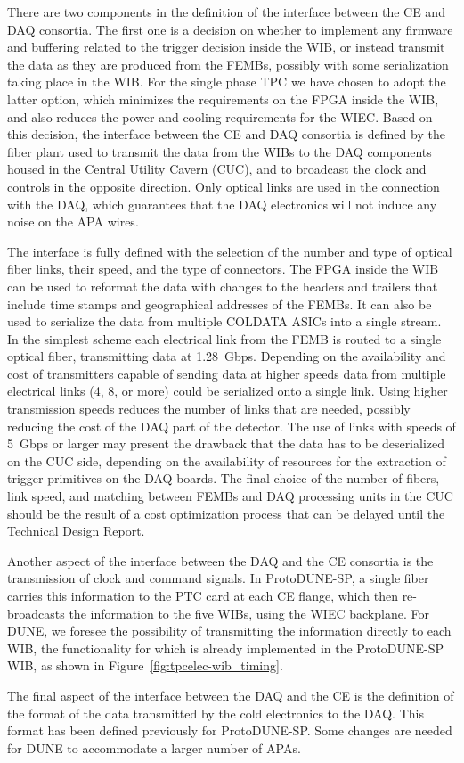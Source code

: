 There are two components in the definition of the interface between the CE
and DAQ consortia. The first one is a decision on whether to implement any
firmware and buffering related to the trigger decision inside the WIB, or
instead transmit the data as they are produced from the FEMBs, possibly with
some serialization taking place in the WIB. For the single phase TPC we have
chosen to adopt the latter option, which minimizes the requirements on the
FPGA inside the WIB, and also reduces the power and cooling requirements for the WIEC.
Based on this decision, the interface between the CE and DAQ consortia is
defined by the fiber plant
used to transmit the data from the WIBs to the DAQ components housed in the
Central Utility Cavern (CUC), and to broadcast the clock and controls in the
opposite direction. Only optical links are used in the connection with the DAQ,
which guarantees that the DAQ electronics will not induce any noise on the
APA wires.

The interface is fully defined with the selection of the number
and type of optical fiber links, their speed, and the type of connectors.
The FPGA inside the WIB can be used to reformat the data with changes to
the headers and trailers that include time stamps and geographical addresses
of the FEMBs. It can also be used to serialize the data from multiple
COLDATA ASICs into a single stream. In the simplest scheme each electrical
link from the FEMB is routed to a single optical fiber, transmitting data
at 1.28~Gbps. Depending on the availability and cost of transmitters
capable of sending data at higher speeds data from multiple electrical
links (4, 8, or more) could be serialized onto a single link. Using higher transmission
speeds reduces the number of links that are needed, possibly reducing the
cost of the DAQ part of the detector. The use of links with speeds
of 5~Gbps or larger may present the
drawback that the data has to be deserialized on the CUC side, depending
on the availability of resources for the extraction of trigger primitives
on the DAQ boards. The final choice of the number of fibers, link speed, and
matching between FEMBs and DAQ processing units in the CUC should be
the result of a cost optimization process that can be delayed until
the Technical Design Report.

Another aspect of the interface between the DAQ and the CE consortia is the
transmission of clock and command signals. In ProtoDUNE-SP, a single fiber
carries this information to the PTC card at each CE flange, which then re-broadcasts
the information to the five WIBs, using the WIEC backplane. For DUNE, we
foresee the possibility of transmitting the information directly to each
WIB, the functionality for which is already implemented in the ProtoDUNE-SP WIB, as
shown in Figure~\ref{fig:tpcelec-wib_timing}.

The final aspect of the interface between the DAQ and the CE is
the definition of the format of the data transmitted by the cold electronics
to the DAQ.  This format has been defined previously for ProtoDUNE-SP.
Some changes are needed for DUNE to accommodate a larger number of APAs.

